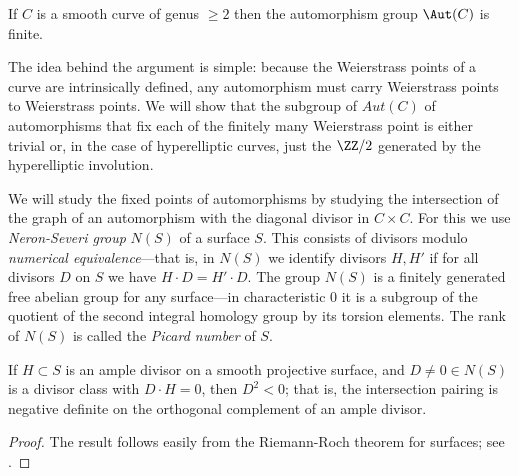 \begin{theorem}\label{finite autos}
If $C$ is a smooth curve of genus $\geq 2$ then the automorphism group $\Aut(C)$ is finite.
\end{theorem}

  The idea behind the argument is simple: because the Weierstrass points of a curve are intrinsically defined, any automorphism must carry Weierstrass points to Weierstrass points. We will show that the subgroup of $Aut(C)$ of automorphisms that fix each  of the finitely many Weierstrass point is either
 trivial or, in the case of hyperelliptic curves, just the $\ZZ/2$ generated by the hyperelliptic involution.
    
We will study the fixed points of automorphisms by studying the intersection of the graph of
an automorphism with the diagonal divisor in $C\times C$. For this we use
\emph{Neron-Severi group} $N(S)$ of a surface $S$. This consists of divisors modulo \emph{numerical equivalence}---that is, in $N(S)$ we identify divisors $H, H'$ if for all divisors $D$ on $S$ we have $H\cdot D = H'\cdot D$. The group
$N(S)$ is a  finitely generated free abelian group for any surface---in characteristic 0 it is a subgroup of the quotient of the second integral homology group by its torsion elements. The rank of $N(S)$ is called the \emph{Picard number} of $S$. 

\begin{theorem}\label{hodge index}
If $H\subset S$ is an ample divisor on a smooth projective surface, and $D \neq 0 \in N(S)$ is a divisor class with $D\cdot H = 0$, then 
$D^2<0$; that is, the intersection pairing is negative definite on the orthogonal complement of an
ample divisor.
\end{theorem}
\begin{proof}
The result follows easily from the Riemann-Roch theorem for surfaces; see \cite[Theorem V.1.9]{Hartshorne1977}.
\end{proof}

